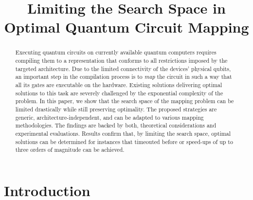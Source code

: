 \documentclass[10pt,conference]{IEEEtran}
\begin{document}
\title{\LARGE Limiting the Search Space in Optimal Quantum Circuit Mapping\vspace*{-0.0em}}

\author{
	\vspace*{-2em}
}

\maketitle

\begin{abstract}
	Executing quantum circuits on currently available quantum computers requires compiling  
	them to a representation that conforms to all restrictions imposed by the targeted architecture.
	Due to the limited connectivity of the devices' physical qubits, an important step in the compilation process is to \emph{map} the circuit in such a way that all its gates are executable on the hardware.
	Existing solutions delivering optimal solutions to this task are severely challenged by the exponential complexity of the problem. 
	In this paper, we show that the search space of the mapping problem can be limited drastically while still preserving optimality.
	The proposed strategies are generic, \mbox{architecture-independent}, and can be adapted to various mapping methodologies.
	The findings are backed by both, theoretical considerations and experimental evaluations. Results confirm that, by limiting the search space, optimal solutions can be determined for instances that timeouted before or speed-ups of up to three orders of magnitude can be achieved.  
\end{abstract}

\section{Introduction}\label{sec:introduction}
\end{document}
